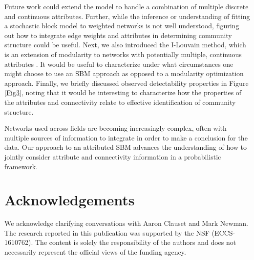 Future work could extend the model to handle a combination of multiple discrete and continuous attributes. Further, while the inference or understanding of fitting a stochastic block model to weighted networks is not well understood, figuring out how to integrate edge weights and attributes in determining community structure could be useful. Next, we also introduced the I-Louvain method, which is an extension of modularity to networks with potentially multiple, continuous attributes \cite{ilouvain}. It would be useful to characterize under what circumstances one might choose to use an SBM approach as opposed to a modularity optimization approach. Finally, we briefly discussed observed detectability properties in Figure \ref{Fig3}, noting that it would be interesting to characterize how the properties of the attributes and connectivity relate to effective identification of community structure.

Networks used across fields are becoming increasingly complex, often with multiple sources of information to integrate in order to make a conclusion for the data. Our approach to an attributed SBM advances the understanding of how to jointly consider attribute and connectivity information in a probabilistic framework. 

\section*{Acknowledgements}
We acknowledge clarifying conversations with Aaron Clauset and Mark Newman. The research reported in this publication was supported by the NSF (ECCS-1610762). The content is solely the responsibility of the authors and does not necessarily represent the official views of the funding agency.

 
  





